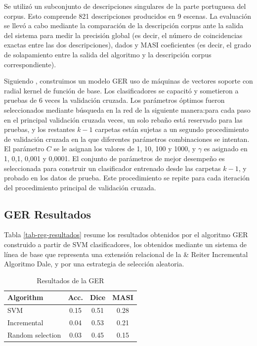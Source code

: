 Se utiliz\'o un subconjunto de descripciones singulares de la parte portuguesa del corpus. Esto comprende 821 descripciones producidos en 9 escenas. La evaluaci\'on se llev\'o a cabo mediante la comparaci\'on de la descripci\'on corpus ante la salida del sistema para medir la precisi\'on global (es decir, el n\'umero de coincidencias exactas entre las dos descripciones), dados \cite{dice} y MASI \cite{masi} coeficientes (es decir, el grado de solapamiento entre la salida del algoritmo y la descripci\'on corpus correspondiente).

Siguiendo \cite{thiago-svm}, construimos un modelo GER uso de m\'aquinas de vectores soporte con radial kernel de funci\'on de base. Los clasificadores se capacit\'o y sometieron a pruebas de 6 veces la validaci\'on cruzada. Los par\'ametros \'optimos fueron seleccionados mediante b\'usqueda en la red de la siguiente manera:para cada paso en el principal validaci\'on cruzada veces, un solo reba\~no est\'a reservado para las pruebas, y los restantes $k-1$ carpetas est\'an sujetas a un segundo procedimiento de validaci\'on cruzada en la que diferentes par\'ametros combinaciones se intentan. El par\'ametro $C$ se le asignan los valores de 1, 10, 100 y 1000, y $\gamma$ es asignado en 1, 0,1, 0,001 y 0,0001. El conjunto de par\'ametros de mejor desempe\~no es seleccionada para construir un clasificador entrenado desde las carpetas $k-1$, y probado en los datos de prueba. Este procedimiento se repite para cada iteraci\'on del procedimiento principal de validaci\'on cruzada.
\subsection{GER Resultados}

Tabla \ref{tab-reg-resultados} resume los resultados obtenidos por el algoritmo GER construido a partir de SVM clasificadores, los obtenidos mediante un sistema de l\'{i}nea de base que representa una extensi\'on relacional de la \& Reiter Incremental Algoritmo Dale, y por una estrategia de selecci\'on aleatoria.

\begin{table}[ht]
\begin{center}
\caption{Resultados de la GER}
\label{tab-reg-results}
\begin{tabular} {  l c c c }
\hline
{Algorithm}							& {Acc.} 	& { Dice}		& MASI \\ \hline 
SVM											& 0.15		& 0.51			& 0.28 \\
Incremental							& 0.04		& 0.53			& 0.21 \\
Random selection       	& 0.03    & 0.45      & 0.15 \\
\hline
\end{tabular}
\end{center}
\end{table}

